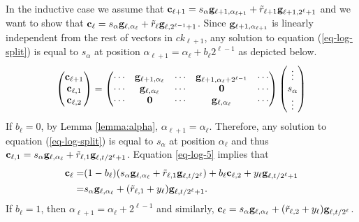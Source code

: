 In the inductive case we assume that \(\mathbf{c}_{\ell+1}=s_{\alpha}\mathbf{g}_{\ell+1,\alpha_{\ell+1}}+\tilde{r}_{\ell+1}\mathbf{g}_{\ell+1,2^\ell+1}\) and we want to show that $\mathbf{c}_\ell = s_\alpha\mathbf{g}_{\ell,\alpha_\ell}+\tilde{r}_\ell\mathbf{g}_{\ell,2^{\ell-1}+1}$. Since \(\mathbf{g}_{\ell+1,\alpha_{\ell+1}}\) is linearly independent from the rest of vectors in \(ck_{\ell+1}\), any solution to equation (\ref{eq-log-split}) is equal to \(s_{\alpha}\) at position \(\alpha_{\ell+1}=\alpha_\ell+b_\ell2^{\ell-1}\) as depicted below.
\begin{align*}
\left(\begin{matrix}\mathbf{c}_{\ell+1}\\\mathbf{c}_{\ell,1}\\\mathbf{c}_{\ell,2}\end{matrix}\right)=
\left(\begin{matrix}
\cdots & \mathbf{g}_{\ell+1,\alpha_\ell} & \cdots  & \mathbf{g}_{\ell+1,\alpha_\ell+2^{\ell-1}} & \cdots\\
\cdots & \mathbf{g}_{\ell,\alpha_\ell}     & \cdots  & \mathbf{0}                           & \cdots\\
\cdots & \mathbf{0}                        & \cdots  & \mathbf{g}_{\ell,\alpha_\ell}        & \cdots
\end{matrix}\right)
\left(\begin{matrix}\vdots\\s_\alpha\\\vdots\end{matrix}\right)
\end{align*}
If $b_{\ell}=0$, by Lemma \ref{lemma:alpha}, $\alpha_{\ell+1}=\alpha_\ell$. Therefore, any solution to equation (\ref{eq-log-split}) is equal to $s_\alpha$ at position $\alpha_\ell$ and thus $\mathbf{c}_{\ell,1} = s_\alpha\mathbf{g}_{\ell,\alpha_\ell}+\tilde{r}_{\ell,1}\mathbf{g}_{\ell,t/2^\ell+1}$.
Equation \ref{eq-log-5} implies that
\begin{align*}
\mathbf{c}_{\ell}=&(1-b_\ell)(s_\alpha\mathbf{g}_{\ell,\alpha_\ell}+\tilde{r}_{\ell,1}\mathbf{g}_{\ell,t/2^\ell})+b_\ell\mathbf{c}_{\ell,2}+y_\ell\mathbf{g}_{\ell,t/2^\ell+1}\\
               =& s_\alpha\mathbf{g}_{\ell,\alpha_\ell}+(\tilde{r}_{\ell,1}+y_\ell)\mathbf{g}_{\ell,t/2^\ell+1}.
\end{align*}
If $b_{\ell}=1$, then $\alpha_{\ell+1}=\alpha_\ell+2^{\ell-1}$ and similarly, $\mathbf{c}_{\ell}=s_\alpha\mathbf{g}_{\ell,\alpha_\ell}+(\tilde{r}_{\ell,2}+y_\ell)\mathbf{g}_{\ell,t/2^\ell}$.

